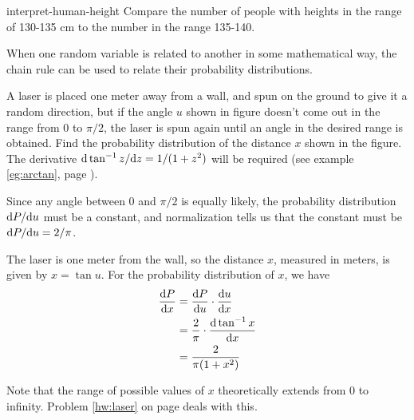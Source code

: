 \begin{selfcheck}{interpret-human-height}
Compare the number of people with heights in the range of
130-135 cm to the number in the range 135-140.
\end{selfcheck}


When one random variable is related to another in some mathematical
way, the chain rule can be used to relate their probability distributions.


\begin{eg}\label{eg:laser}
\egquestion A laser is placed one meter away from a wall, and spun
on the ground to give it a random direction, but if the angle $u$ shown in figure
 doesn't
come out in the range from 0 to $\pi/2$, the laser is spun again until
an angle in the desired range is obtained. Find the probability distribution
of the distance $x$ shown in the figure. The derivative
$\textup{d}\tan^{-1}z/\textup{d} z=1/(1+z^2)$ will be required (see example \ref{eg:arctan},
page \pageref{eg:arctan}).

\eganswer Since any angle between 0 and $\pi/2$ is equally likely, the
probability distribution $\textup{d} P/\textup{d} u$ must be a constant, and normalization
tells us that the constant must be $\textup{d} P/\textup{d} u=2/\pi$. 

The laser is one meter from the wall, so the distance $x$, measured in
meters, is given by $x=\tan u$. For the probability distribution of $x$, we have
\begin{align*}
  \frac{\textup{d} P}{\textup{d} x} &= \frac{\textup{d} P}{\textup{d} u}\cdot\frac{\textup{d} u}{\textup{d} x} \\
        &= \frac{2}{\pi}\cdot\frac{\textup{d} \tan^{-1}x}{\textup{d} x} \\
        &= \frac{2}{\pi(1+x^2)}
\end{align*}

Note that the range of possible values of $x$ theoretically extends from 0 to
infinity. Problem \ref{hw:laser} on page \pageref{hw:laser} deals with this.
\end{eg}

